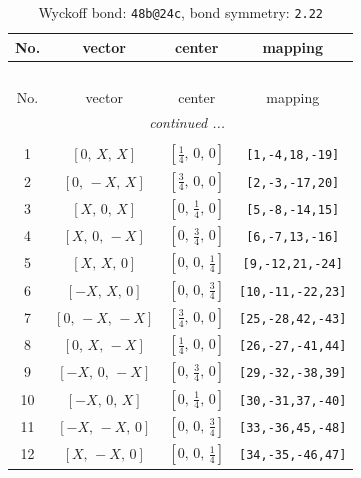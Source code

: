 \documentclass[fleqn,8pt]{jsarticle}
\begin{document}
\renewcommand{\arraystretch}{1.2}
\begin{longtable}{cccc}
\caption{Wyckoff bond: {\tt 48b@24c}, bond symmetry: {\tt 2.22}}
 \\
 \hline \hline
No. & vector & center & mapping \\ \hline \endfirsthead

\multicolumn{3}{l}{\tablename\ \thetable{}} \\
 \hline \hline
No. & vector & center & mapping \\ \hline \endhead

 \hline \hline
\multicolumn{3}{r}{\footnotesize\it continued ...} \\ \endfoot

 \hline \hline
\multicolumn{3}{r}{} \\ \endlastfoot

1 & $\left[ 0,\, X,\, X \right]$ & $\left[ \frac{1}{4},\, 0,\, 0 \right]$ & {\tt [1,-4,18,-19]} \\ \hline
2 & $\left[ 0,\, - X,\, X \right]$ & $\left[ \frac{3}{4},\, 0,\, 0 \right]$ & {\tt [2,-3,-17,20]} \\ \hline
3 & $\left[ X,\, 0,\, X \right]$ & $\left[ 0,\, \frac{1}{4},\, 0 \right]$ & {\tt [5,-8,-14,15]} \\ \hline
4 & $\left[ X,\, 0,\, - X \right]$ & $\left[ 0,\, \frac{3}{4},\, 0 \right]$ & {\tt [6,-7,13,-16]} \\ \hline
5 & $\left[ X,\, X,\, 0 \right]$ & $\left[ 0,\, 0,\, \frac{1}{4} \right]$ & {\tt [9,-12,21,-24]} \\ \hline
6 & $\left[ - X,\, X,\, 0 \right]$ & $\left[ 0,\, 0,\, \frac{3}{4} \right]$ & {\tt [10,-11,-22,23]} \\ \hline
7 & $\left[ 0,\, - X,\, - X \right]$ & $\left[ \frac{3}{4},\, 0,\, 0 \right]$ & {\tt [25,-28,42,-43]} \\ \hline
8 & $\left[ 0,\, X,\, - X \right]$ & $\left[ \frac{1}{4},\, 0,\, 0 \right]$ & {\tt [26,-27,-41,44]} \\ \hline
9 & $\left[ - X,\, 0,\, - X \right]$ & $\left[ 0,\, \frac{3}{4},\, 0 \right]$ & {\tt [29,-32,-38,39]} \\ \hline
10 & $\left[ - X,\, 0,\, X \right]$ & $\left[ 0,\, \frac{1}{4},\, 0 \right]$ & {\tt [30,-31,37,-40]} \\ \hline
11 & $\left[ - X,\, - X,\, 0 \right]$ & $\left[ 0,\, 0,\, \frac{3}{4} \right]$ & {\tt [33,-36,45,-48]} \\ \hline
12 & $\left[ X,\, - X,\, 0 \right]$ & $\left[ 0,\, 0,\, \frac{1}{4} \right]$ & {\tt [34,-35,-46,47]} \\
\end{longtable}
\end{document}
